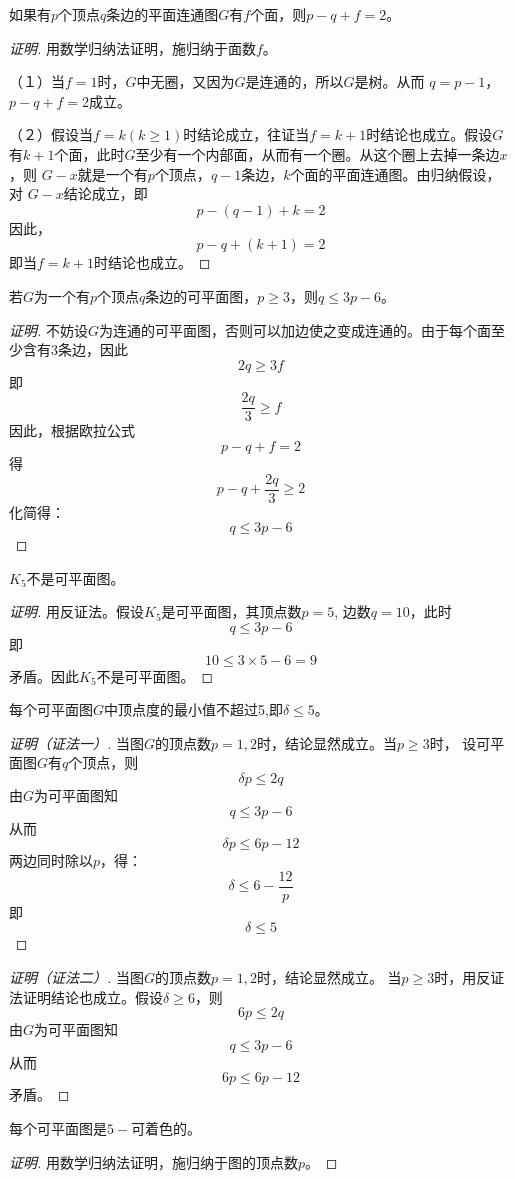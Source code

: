 \documentclass{article}
\begin{document}
\begin{CJK}{UTF8}{gbsn}
\begin{Th2}
如果有$p$个顶点$q$条边的平面连通图$G$有$f$个面，则$p - q + f = 2$。
\end{Th2}
\begin{proof}[证明]
    用数学归纳法证明，施归纳于面数$f$。

  （１）当$f=1$时，$G$中无圈，又因为$G$是连通的，所以$G$是树。从而
  $q=p-1$，$p-q+f=2$成立。

  （２）假设当$f=k(k\geq 1)$时结论成立，往证当$f=k+1$时结论也成立。假设$G$有$k+1$个面，此时$G$至少有一个内部面，从而有一个圈。从这个圈上去掉一条边$x$，则
  $G-x$就是一个有$p$个顶点，$q-1$条边，$k$个面的平面连通图。由归纳假设，对
  $G-x$结论成立，即\[p-(q-1) + k =2\]
  因此，\[p-q+ (k+1) =2\]
  即当$f=k+1$时结论也成立。
\end{proof}

\begin{Th2}
若$G$为一个有$p$个顶点$q$条边的可平面图，$p\geq 3$，则$q \leq 3p - 6$。
\end{Th2}
\begin{proof}[证明]
  不妨设$G$为连通的可平面图，否则可以加边使之变成连通的。由于每个面至少含有3条边，因此
  \[2q \geq 3f\]
  即
  \[\frac{2q}{3} \geq f\]
  因此，根据欧拉公式
  \[p - q + f = 2\]
  得
  \[p - q + \frac{2q}{3} \geq 2\]
  化简得：
  \[q \leq 3p - 6\]
\end{proof}

\begin{Th2}
      $K_5$不是可平面图。
\end{Th2}
\begin{proof}[证明]
  用反证法。假设$K_5$是可平面图，其顶点数$p = 5$, 边数$q = 10$，此时
  \[q \leq 3p - 6\]
  即
  \[10 \leq 3 \times 5 - 6 = 9\]
  矛盾。因此$K_5$不是可平面图。
\end{proof}
    
\begin{Th2}
每个可平面图$G$中顶点度的最小值不超过5,即$\delta  \leq 5$。   
\end{Th2}
\begin{proof}[证明（证法一）]
  当图$G$的顶点数$p=1,2$时，结论显然成立。当$p\geq 3$时，
  设可平面图$G$有$q$个顶点，则
  \[\delta p \leq 2q\]
  由$G$为可平面图知
  \[q \leq 3p - 6\]
  从而
  \[\delta p \leq 6p - 12\]
  两边同时除以$p$，得：
  \[\delta \leq 6 - \frac{12}{p}\]
  即
  \[\delta \leq 5\]
\end{proof}
\begin{proof}[证明（证法二）]
  当图$G$的顶点数$p=1,2$时，结论显然成立。
  当$p \geq 3$时，用反证法证明结论也成立。假设$\delta \geq 6$，则
  \[6p \leq 2q\]
  由$G$为可平面图知
  \[q \leq 3p - 6\]
  从而
  \[6p \leq 6p - 12\]
矛盾。  
\end{proof}
\begin{Th2}
  每个可平面图是$5-$可着色的。
\end{Th2}
\begin{proof}[证明]
  用数学归纳法证明，施归纳于图的顶点数$p$。


\end{proof}
\end{CJK}
\end{document}
